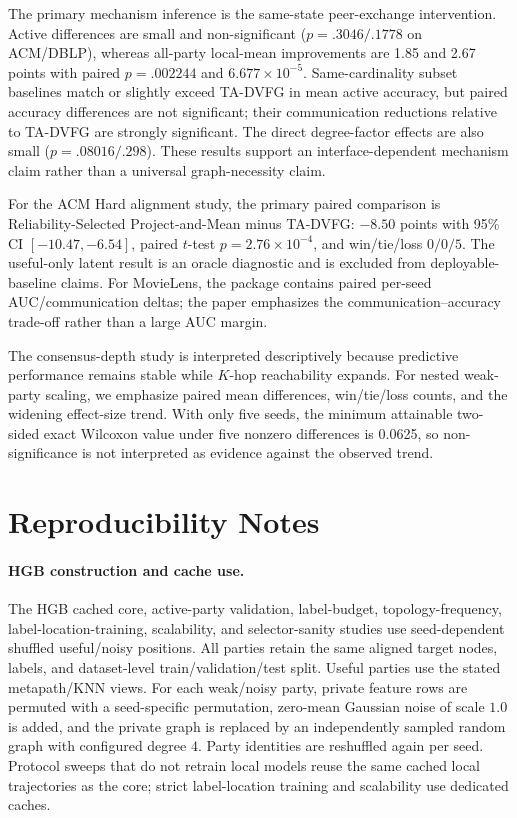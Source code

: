 \documentclass[letterpaper]{article}
\newcommand{\method}{\textsc{TA-DVFG}}
\begin{document}
The primary mechanism inference is the same-state peer-exchange intervention.
Active differences are small and non-significant
($p=.3046/.1778$ on ACM/DBLP), whereas all-party local-mean improvements are
1.85 and 2.67 points with paired $p=.002244$ and
$6.677\times10^{-5}$. Same-cardinality subset baselines match or slightly
exceed \method{} in mean active accuracy, but paired accuracy differences are
not significant; their communication reductions relative to \method{} are
strongly significant. The direct degree-factor effects are also small
($p=.08016/.298$). These results support an interface-dependent mechanism claim
rather than a universal graph-necessity claim.

For the ACM Hard alignment study, the primary paired comparison is
Reliability-Selected Project-and-Mean minus \method{}: $-8.50$ points with
95\% CI $[-10.47,-6.54]$, paired $t$-test
$p=2.76\times10^{-4}$, and win/tie/loss $0/0/5$. The useful-only latent result
is an oracle diagnostic and is excluded from deployable-baseline claims. For
MovieLens, the package contains paired per-seed AUC/communication deltas; the
paper emphasizes the communication--accuracy trade-off rather than a large AUC
margin.

The consensus-depth study is interpreted descriptively because predictive
performance remains stable while $K$-hop reachability expands. For nested
weak-party scaling, we emphasize paired mean differences, win/tie/loss counts,
and the widening effect-size trend. With only five seeds, the minimum attainable
two-sided exact Wilcoxon value under five nonzero differences is 0.0625, so
non-significance is not interpreted as evidence against the observed trend.

\section{Reproducibility Notes}

\paragraph{HGB construction and cache use.}
The HGB cached core, active-party validation, label-budget,
topology-frequency, label-location-training, scalability, and selector-sanity
studies use seed-dependent shuffled useful/noisy positions. All parties retain
the same aligned target nodes, labels, and dataset-level
train/validation/test split. Useful parties use the stated metapath/KNN views.
For each weak/noisy party, private feature rows are permuted with a
seed-specific permutation, zero-mean Gaussian noise of scale $1.0$ is added,
and the private graph is replaced by an independently sampled random graph with
configured degree $4$. Party identities are reshuffled again per seed.
Protocol sweeps that do not retrain local models reuse the same cached local
trajectories as the core; strict label-location training and scalability use
dedicated caches.
\end{document}
